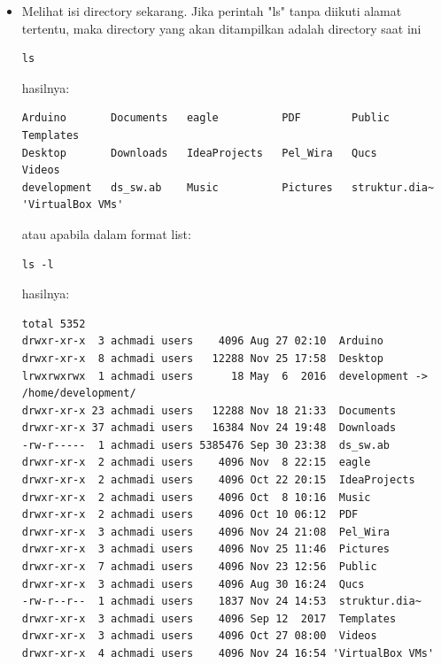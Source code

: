 \documentclass[12pt,]{article}
\begin{document}
\begin{itemize}
\begin{itemize}
			\item Melihat isi directory sekarang. Jika perintah "ls" tanpa diikuti alamat tertentu, maka directory yang akan ditampilkan adalah directory saat ini
			\begin{verbatim}
ls
			\end{verbatim}
			hasilnya:
			\begin{verbatim}
Arduino       Documents   eagle          PDF        Public          Templates
Desktop       Downloads   IdeaProjects   Pel_Wira   Qucs            Videos
development   ds_sw.ab    Music          Pictures   struktur.dia~  'VirtualBox VMs'
			\end{verbatim}
			atau apabila dalam format list:
			\begin{verbatim}
ls -l
			\end{verbatim}
			hasilnya:
			\begin{verbatim}
total 5352
drwxr-xr-x  3 achmadi users    4096 Aug 27 02:10  Arduino
drwxr-xr-x  8 achmadi users   12288 Nov 25 17:58  Desktop
lrwxrwxrwx  1 achmadi users      18 May  6  2016  development -> /home/development/
drwxr-xr-x 23 achmadi users   12288 Nov 18 21:33  Documents
drwxr-xr-x 37 achmadi users   16384 Nov 24 19:48  Downloads
-rw-r-----  1 achmadi users 5385476 Sep 30 23:38  ds_sw.ab
drwxr-xr-x  2 achmadi users    4096 Nov  8 22:15  eagle
drwxr-xr-x  2 achmadi users    4096 Oct 22 20:15  IdeaProjects
drwxr-xr-x  2 achmadi users    4096 Oct  8 10:16  Music
drwxr-xr-x  2 achmadi users    4096 Oct 10 06:12  PDF
drwxr-xr-x  3 achmadi users    4096 Nov 24 21:08  Pel_Wira
drwxr-xr-x  3 achmadi users    4096 Nov 25 11:46  Pictures
drwxr-xr-x  7 achmadi users    4096 Nov 23 12:56  Public
drwxr-xr-x  3 achmadi users    4096 Aug 30 16:24  Qucs
-rw-r--r--  1 achmadi users    1837 Nov 24 14:53  struktur.dia~
drwxr-xr-x  3 achmadi users    4096 Sep 12  2017  Templates
drwxr-xr-x  3 achmadi users    4096 Oct 27 08:00  Videos
drwxr-xr-x  4 achmadi users    4096 Nov 24 16:54 'VirtualBox VMs'
			\end{verbatim}


\end{itemize}
\end{itemize}
\end{document}
